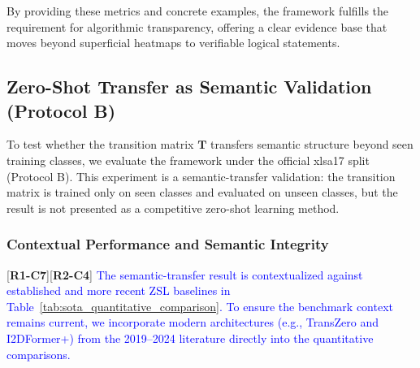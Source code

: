 \documentclass[make,article,submit,pdftex,moreauthors]{Definitions/mdpi}
\newcommand{\matT}{\mathbf{T}}
\newcommand{\revtag}[2]{[\textbf{R#1-C#2}]}
\newcommand{\Rone}[1]{\textcolor{red}{#1}}
\newcommand{\Rtwo}[1]{\textcolor{blue}{#1}}
\begin{document}
By providing these metrics and concrete examples, the framework fulfills the requirement for algorithmic transparency, offering a clear evidence base that moves beyond superficial heatmaps to verifiable logical statements.

\subsection{Zero-Shot Transfer as Semantic Validation (Protocol B)}
\label{subsec:protocol_b_results}

To test whether the transition matrix $\matT$ transfers semantic structure beyond seen training classes, we evaluate the framework under the official xlsa17 split (Protocol B). This experiment is a semantic-transfer validation: the transition matrix is trained only on seen classes and evaluated on unseen classes, but the result is not presented as a competitive zero-shot learning method.

\subsubsection{Contextual Performance and Semantic Integrity}
\label{subsubsec:semantic_integrity}

\revtag{1}{7}\revtag{2}{4} \Rone{\Rtwo{The semantic-transfer result is contextualized against established and more recent ZSL baselines in Table~\ref{tab:sota_quantitative_comparison}. To ensure the benchmark context remains current, we incorporate modern architectures (e.g., TransZero and I2DFormer+) from the 2019--2024 literature directly into the quantitative comparisons.}} 
\end{document}
